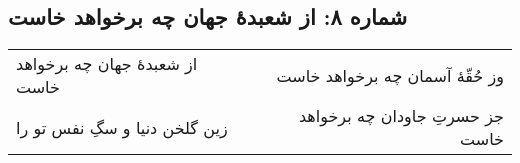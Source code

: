\begin{center}
\section*{شماره ۸: از شعبدۀ جهان چه برخواهد خاست}
\label{sec:008}
\begin{longtable}{l p{0.5cm} r}
از شعبدهٔ جهان چه برخواهد خاست
&&
وز حُقّهٔ آسمان چه برخواهد خاست
\\
زین گلخن دنیا و سگِ نفس تو را
&&
جز حسرتِ جاودان چه برخواهد خاست
\\
\end{longtable}
\end{center}
